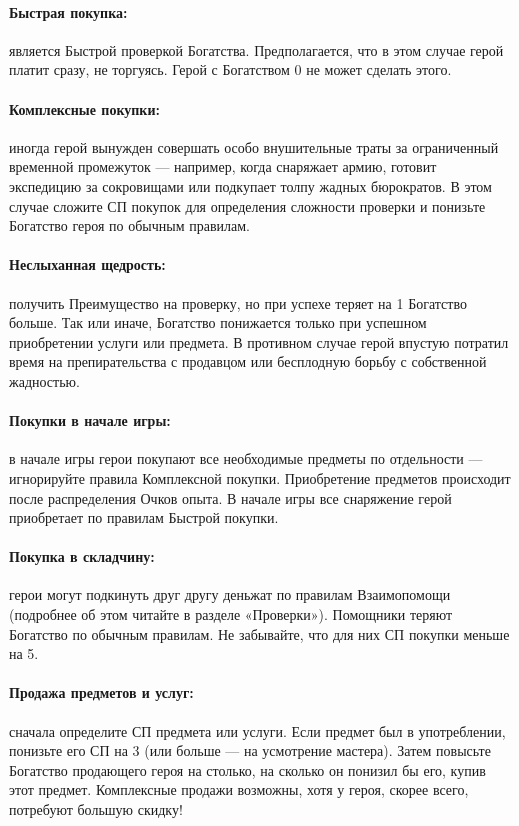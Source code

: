 \paragraph{Быстрая покупка:} является Быстрой проверкой Богатства. Предполагается, что в этом случае герой платит сразу, не торгуясь. Герой с Богатством 0 не может сделать этого.
\paragraph{Комплексные покупки:} иногда герой вынужден совершать особо внушительные траты за ограниченный временной промежуток — например, когда снаряжает армию, готовит экспедицию за сокровищами или подкупает толпу жадных бюрократов. В этом случае сложите СП покупок для определения сложности проверки и понизьте Богатство героя по обычным правилам.
\paragraph{Неслыханная щедрость:} получить Преимущество на проверку, но при успехе теряет на 1 Богатство больше. Так или иначе, Богатство понижается только при успешном приобретении услуги или предмета. В противном случае герой впустую потратил время на препирательства с продавцом или бесплодную борьбу с собственной жадностью.
\paragraph{Покупки в начале игры:} в начале игры герои покупают все необходимые предметы по отдельности — игнорируйте правила Комплексной покупки. Приобретение предметов происходит после распределения Очков опыта. В начале игры все снаряжение герой приобретает по правилам Быстрой покупки.
\paragraph{Покупка в складчину:} герои могут подкинуть друг другу деньжат по правилам Взаимопомощи (подробнее об этом читайте в разделе «Проверки»). Помощники теряют Богатство по обычным правилам. Не забывайте, что для них СП покупки меньше на 5.
\paragraph{Продажа предметов и услуг:} сначала определите СП предмета или услуги. Если предмет был в употреблении, понизьте его СП на 3 (или больше — на усмотрение мастера). Затем повысьте Богатство продающего героя на столько, на сколько он понизил бы его, купив этот предмет. Комплексные продажи возможны, хотя у героя, скорее всего, потребуют большую скидку!
